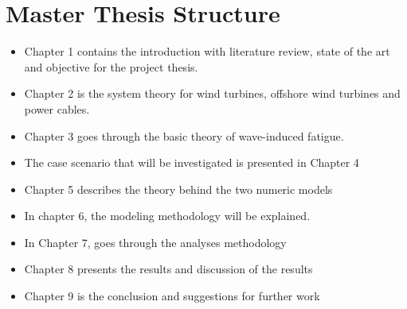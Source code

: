 \section{Master Thesis Structure}
\begin{itemize}
    \item Chapter 1 contains the introduction with literature review, state of the art and objective for the project thesis.
     \item Chapter 2 is the system theory for wind turbines, offshore wind turbines and power cables.
      \item Chapter 3 goes through the basic theory of wave-induced fatigue. 
      \item The case scenario that will be investigated is presented in Chapter 4
      \item Chapter 5 describes the theory behind the two numeric models
      \item In chapter 6, the modeling methodology will be explained.
      \item In Chapter 7, goes through the analyses methodology
      \item Chapter 8 presents the results and discussion of the results
      \item Chapter 9 is the conclusion and suggestions for further work
\end{itemize}

